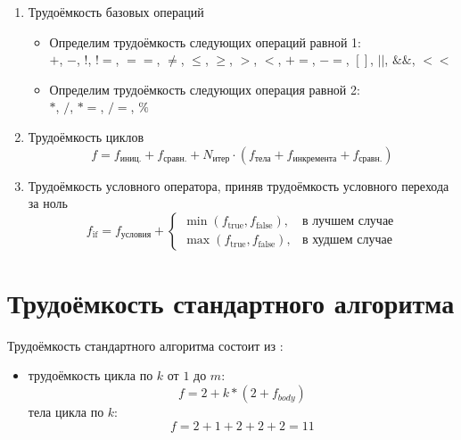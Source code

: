 \begin{enumerate}
	\item Трудоёмкость базовых операций
    \begin{itemize}
	\item Определим трудоёмкость следующих операций равной 1:\\
	\( + \), \( - \), \( ! \), \( != \), \( == \), \( \neq \), \( \leq \), \( \geq \), \( > \), \( < \), \( += \), \( -= \), \( []\), \( || \), \( \&\& \), \( << \)
	\item Определим трудоёмкость следующих операция равной 2:\\
	\( * \), \( / \), \( *= \), \( /= \), \( \% \)
\end{itemize}
	\item Трудоёмкость циклов
	\begin{equation}\label{eq:cycle_complexity}
		f = f_{\text{иниц.}} + f_{\text{сравн.}} + N_{\text{итер}} \cdot (f_{\text{тела}} + f_{\text{инкремента}} + f_{\text{сравн.}})
	\end{equation}
	\item Трудоёмкость условного оператора, приняв трудоёмкость условного перехода за ноль
	\begin{equation}\label{eq:if_complexity}
		f_{\text{if}} = f_{\text{условия}} + \begin{cases}
			\min(f_{\text{true}}, f_{\text{false}}), & \text{в лучшем случае} \\
			\max(f_{\text{true}}, f_{\text{false}}), & \text{в худшем случае}
		\end{cases}
	\end{equation}
\end{enumerate}

\section{Трудоёмкость стандартного алгоритма}
Трудоёмкость стандартного алгоритма состоит из :
\begin{itemize}
 цикла по \(i \) от \( 1 \) до \(n \): \begin{equation}f = 2 + n * (2 + f_{body})  \end{equation}
 цикла по \(j\) от \( 1 \) до \(t \): \begin{equation}f = 2 + t * (2 + f_{body})  \end{equation}
\item трудоёмкость цикла по \(k\) от \( 1 \) до \(m \): \begin{equation}f = 2 + k * (2 + f_{body})  \end{equation}
 тела цикла по \(k\): \begin{equation}f = 2 + 1 + 2 + 2 + 2 = 11
   \end{equation}
\end{itemize}


